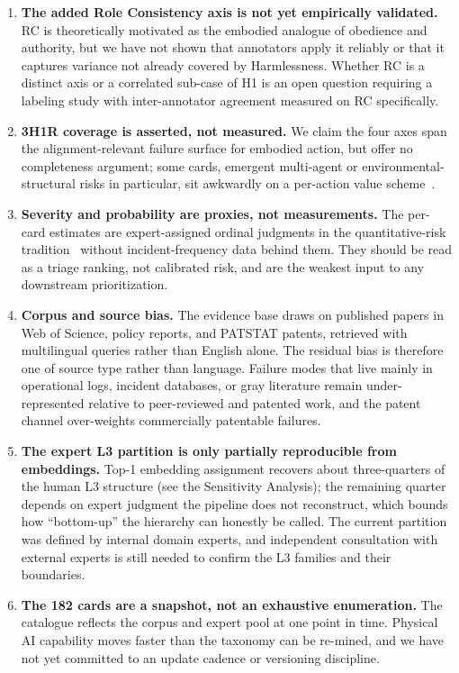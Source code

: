 \documentclass[11pt]{article}
\begin{document}
\begin{enumerate}[leftmargin=1.5em,itemsep=0.3em]
  \item \textbf{The added Role Consistency axis is not yet empirically validated.} RC is theoretically motivated as the embodied analogue of obedience and authority, but we have not shown that annotators apply it reliably or that it captures variance not already covered by Harmlessness. Whether RC is a distinct axis or a correlated sub-case of H1 is an open question requiring a labeling study with inter-annotator agreement measured on RC specifically.
  \item \textbf{3H1R coverage is asserted, not measured.} We claim the four axes span the alignment-relevant failure surface for embodied action, but offer no completeness argument; some cards, emergent multi-agent or environmental-structural risks in particular, sit awkwardly on a per-action value scheme~\cite{hendrycks2023}.
  \item \textbf{Severity and probability are proxies, not measurements.} The per-card estimates are expert-assigned ordinal judgments in the quantitative-risk tradition~\cite{kaplan1981} without incident-frequency data behind them. They should be read as a triage ranking, not calibrated risk, and are the weakest input to any downstream prioritization.
  \item \textbf{Corpus and source bias.} The evidence base draws on published papers in Web of Science, policy reports, and PATSTAT patents, retrieved with multilingual queries rather than English alone. The residual bias is therefore one of source type rather than language. Failure modes that live mainly in operational logs, incident databases, or gray literature remain under-represented relative to peer-reviewed and patented work, and the patent channel over-weights commercially patentable failures.
  \item \textbf{The expert L3 partition is only partially reproducible from embeddings.} Top-1 embedding assignment recovers about three-quarters of the human L3 structure (see the Sensitivity Analysis); the remaining quarter depends on expert judgment the pipeline does not reconstruct, which bounds how ``bottom-up'' the hierarchy can honestly be called. The current partition was defined by internal domain experts, and independent consultation with external experts is still needed to confirm the L3 families and their boundaries.
  \item \textbf{The 182 cards are a snapshot, not an exhaustive enumeration.} The catalogue reflects the corpus and expert pool at one point in time. Physical AI capability moves faster than the taxonomy can be re-mined, and we have not yet committed to an update cadence or versioning discipline.

\end{enumerate}
\end{document}
